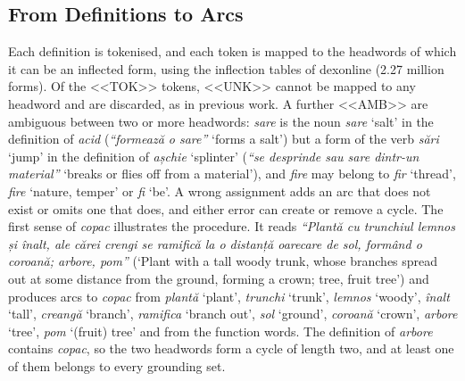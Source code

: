 \documentclass[11pt]{article}
\newcommand{\ro}[1]{\textit{#1}}
\begin{document}
\subsection{From Definitions to Arcs}
Each definition is tokenised, and each token is mapped to the headwords of which it can be an inflected form, using the inflection tables of dexonline (2.27 million forms). Of the <<TOK>> tokens, <<UNK>> cannot be mapped to any headword and are discarded, as in previous work. A further <<AMB>> are ambiguous between two or more headwords: \ro{sare} is the noun \ro{sare} `salt' in the definition of \ro{acid} (\emph{``formează o sare''} `forms a salt') but a form of the verb \ro{sări} `jump' in the definition of \ro{așchie} `splinter' (\emph{``se desprinde sau sare dintr-un material''} `breaks or flies off from a material'), and \ro{fire} may belong to \ro{fir} `thread', \ro{fire} `nature, temper' or \ro{fi} `be'. A wrong assignment adds an arc that does not exist or omits one that does, and either error can create or remove a cycle. The first sense of \ro{copac} illustrates the procedure. It reads \emph{``Plantă cu trunchiul lemnos și înalt, ale cărei crengi se ramifică la o distanță oarecare de sol, formând o coroană; arbore, pom''} (`Plant with a tall woody trunk, whose branches spread out at some distance from the ground, forming a crown; tree, fruit tree') and produces arcs to \ro{copac} from \ro{plantă} `plant', \ro{trunchi} `trunk', \ro{lemnos} `woody', \ro{înalt} `tall', \ro{creangă} `branch', \ro{ramifica} `branch out', \ro{sol} `ground', \ro{coroană} `crown', \ro{arbore} `tree', \ro{pom} `(fruit) tree' and from the function words. The definition of \ro{arbore} contains \ro{copac}, so the two headwords form a cycle of length two, and at least one of them belongs to every grounding set.
\end{document}
